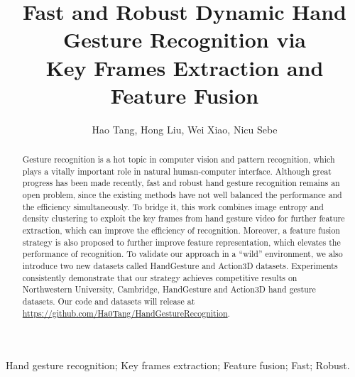 \documentclass[5p]{elsarticle}
\begin{document}
\begin{frontmatter}

\title{Fast and Robust Dynamic Hand Gesture Recognition via \\ Key Frames Extraction and Feature Fusion}

\author{Hao Tang, Hong Liu, Wei Xiao, Nicu Sebe}

\address{
Department of Information Engineering and Computer Science, University of Trento, Trento, Italy \\
Key Laboratory of Machine Perception, Shenzhen Graduate School, Peking University, Beijing, China \\
Lingxi Artificial Intelligence Co., Ltd, Shen Zhen, China\\  
}



\begin{abstract}
	Gesture recognition is a hot topic in computer vision and pattern recognition, which plays a vitally important role in natural human-computer interface.
	Although great progress has been made recently, fast and robust hand gesture recognition remains an open problem,
	since the existing methods have not well balanced the performance and the efficiency simultaneously.
	To bridge it, this work combines image entropy and density clustering to exploit the key frames from hand gesture video for further feature extraction, which can improve the efficiency of recognition.
	Moreover, a feature fusion strategy is also proposed to further improve feature representation, which elevates the performance of recognition.
	To validate our approach in a ``wild'' environment, we also introduce two new datasets called HandGesture and Action3D datasets.
	Experiments consistently demonstrate that our strategy achieves competitive results on Northwestern University, Cambridge, HandGesture and Action3D hand gesture datasets.
	Our code and datasets will release at \url{https://github.com/Ha0Tang/HandGestureRecognition}.
\end{abstract}

\begin{keyword}
Hand gesture recognition; Key frames extraction; Feature fusion; Fast; Robust.
\end{keyword}

\end{frontmatter}
\end{document}
